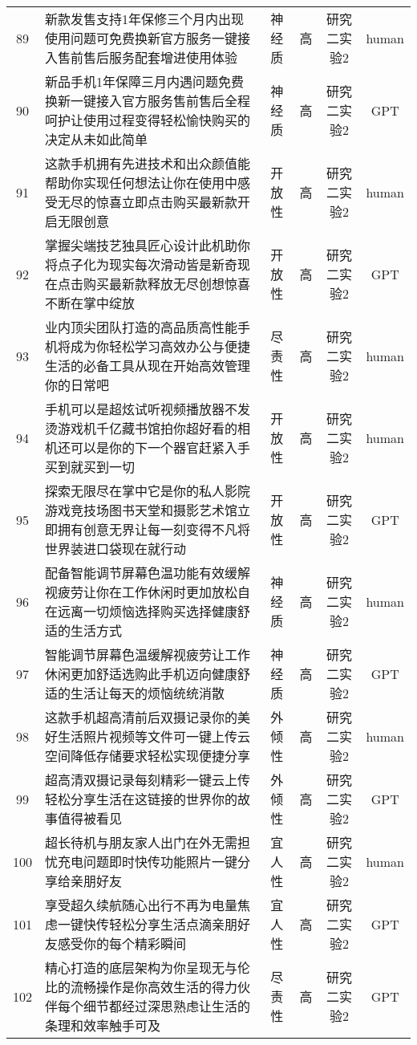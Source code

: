 {\begin{longtable}{c p{8cm} c c c c}
        89 & 新款发售支持1年保修三个月内出现使用问题可免费换新官方服务一键接入售前售后服务配套增进使用体验 & 神经质 & 高 & 研究二实验2 & human \\
        90 & 新品手机1年保障三月内遇问题免费换新一键接入官方服务售前售后全程呵护让使用过程变得轻松愉快购买的决定从未如此简单 & 神经质 & 高 & 研究二实验2 & GPT \\
        91 & 这款手机拥有先进技术和出众颜值能帮助你实现任何想法让你在使用中感受无尽的惊喜立即点击购买最新款开启无限创意 & 开放性 & 高 & 研究二实验2 & human \\
        92 & 掌握尖端技艺独具匠心设计此机助你将点子化为现实每次滑动皆是新奇现在点击购买最新款释放无尽创想惊喜不断在掌中绽放 & 开放性 & 高 & 研究二实验2 & GPT \\
        93 & 业内顶尖团队打造的高品质高性能手机将成为你轻松学习高效办公与便捷生活的必备工具从现在开始高效管理你的日常吧 & 尽责性 & 高 & 研究二实验2 & human \\
        94 & 手机可以是超炫试听视频播放器不发烫游戏机千亿藏书馆拍你超好看的相机还可以是你的下一个器官赶紧入手买到就买到一切 & 开放性 & 高 & 研究二实验2 & human \\
        95 & 探索无限尽在掌中它是你的私人影院游戏竞技场图书天堂和摄影艺术馆立即拥有创意无界让每一刻变得不凡将世界装进口袋现在就行动 & 开放性 & 高 & 研究二实验2 & GPT \\
        96 & 配备智能调节屏幕色温功能有效缓解视疲劳让你在工作休闲时更加放松自在远离一切烦恼选择购买选择健康舒适的生活方式 & 神经质 & 高 & 研究二实验2 & human \\
        97 & 智能调节屏幕色温缓解视疲劳让工作休闲更加舒适选购此手机迈向健康舒适的生活让每天的烦恼统统消散 & 神经质 & 高 & 研究二实验2 & GPT \\
        98 & 这款手机超高清前后双摄记录你的美好生活照片视频等文件可一键上传云空间降低存储要求轻松实现便捷分享 & 外倾性 & 高 & 研究二实验2 & human \\
        99 & 超高清双摄记录每刻精彩一键云上传轻松分享生活在这链接的世界你的故事值得被看见 & 外倾性 & 高 & 研究二实验2 & GPT \\
        100 & 超长待机与朋友家人出门在外无需担忧充电问题即时快传功能照片一键分享给亲朋好友 & 宜人性 & 高 & 研究二实验2 & human \\
        101 & 享受超久续航随心出行不再为电量焦虑一键快传轻松分享生活点滴亲朋好友感受你的每个精彩瞬间 & 宜人性 & 高 & 研究二实验2 & GPT \\
        102 & 精心打造的底层架构为你呈现无与伦比的流畅操作是你高效生活的得力伙伴每个细节都经过深思熟虑让生活的条理和效率触手可及 & 尽责性 & 高 & 研究二实验2 & GPT \\

\end{longtable}}
